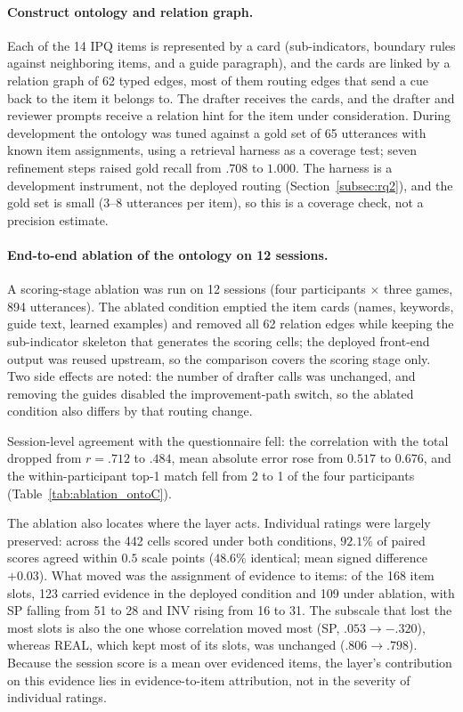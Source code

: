 \paragraph{Construct ontology and relation graph.}
Each of the 14 IPQ items is represented by a card (sub-indicators, boundary rules against neighboring items, and a guide paragraph), and the cards are linked by a relation graph of 62 typed edges, most of them routing edges that send a cue back to the item it belongs to. The drafter receives the cards, and the drafter and reviewer prompts receive a relation hint for the item under consideration. During development the ontology was tuned against a gold set of 65 utterances with known item assignments, using a retrieval harness as a coverage test; seven refinement steps raised gold recall from $.708$ to $1.000$. The harness is a development instrument, not the deployed routing (Section~\ref{subsec:rq2}), and the gold set is small (3--8 utterances per item), so this is a coverage check, not a precision estimate.

\paragraph{End-to-end ablation of the ontology on 12 sessions.}
A scoring-stage ablation was run on 12 sessions (four participants $\times$ three games, 894 utterances). The ablated condition emptied the item cards (names, keywords, guide text, learned examples) and removed all 62 relation edges while keeping the sub-indicator skeleton that generates the scoring cells; the deployed front-end output was reused upstream, so the comparison covers the scoring stage only. Two side effects are noted: the number of drafter calls was unchanged, and removing the guides disabled the improvement-path switch, so the ablated condition also differs by that routing change.

Session-level agreement with the questionnaire fell: the correlation with the total dropped from $r=.712$ to $.484$, mean absolute error rose from $0.517$ to $0.676$, and the within-participant top-1 match fell from 2 to 1 of the four participants (Table~\ref{tab:ablation_ontoC}).

The ablation also locates where the layer acts. Individual ratings were largely preserved: across the 442 cells scored under both conditions, $92.1\%$ of paired scores agreed within $0.5$ scale points ($48.6\%$ identical; mean signed difference $+0.03$). What moved was the assignment of evidence to items: of the 168 item slots, 123 carried evidence in the deployed condition and 109 under ablation, with SP falling from 51 to 28 and INV rising from 16 to 31. The subscale that lost the most slots is also the one whose correlation moved most (SP, $.053 \rightarrow -.320$), whereas REAL, which kept most of its slots, was unchanged ($.806 \rightarrow .798$). Because the session score is a mean over evidenced items, the layer's contribution on this evidence lies in evidence-to-item attribution, not in the severity of individual ratings.

